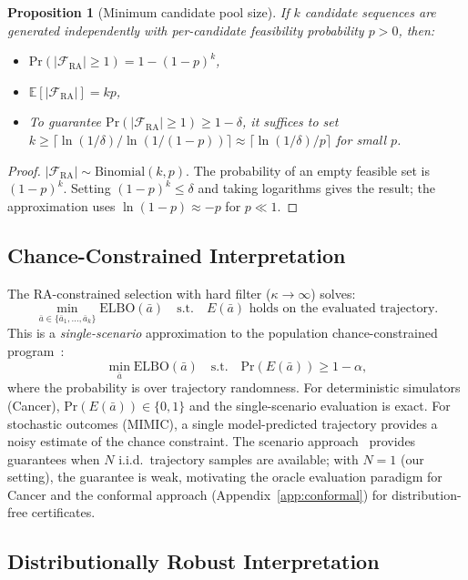 \documentclass{article}
\newtheorem{proposition}[theorem]{Proposition}
\newcommand{\E}{\mathbb{E}}
\renewcommand{\Pr}{\mathrm{Pr}}
\newcommand{\ba}{\bar{a}}
\newcommand{\cF}{\mathcal{F}}
\begin{document}
\begin{proposition}[Minimum candidate pool size]
\label{prop:feasibility}
If $k$ candidate sequences are generated independently with per-candidate feasibility probability $p > 0$, then:
\begin{itemize}
    \item $\Pr(|\cF_{\mathrm{RA}}| \geq 1) = 1 - (1-p)^k$,
    \item $\E[|\cF_{\mathrm{RA}}|] = kp$,
    \item To guarantee $\Pr(|\cF_{\mathrm{RA}}| \geq 1) \geq 1 - \delta$, it suffices to set $k \geq \lceil \ln(1/\delta) / \ln(1/(1-p)) \rceil \approx \lceil \ln(1/\delta) / p \rceil$ for small $p$.
\end{itemize}
\end{proposition}

\begin{proof}
$|\cF_{\mathrm{RA}}| \sim \mathrm{Binomial}(k, p)$. The probability of an empty feasible set is $(1-p)^k$. Setting $(1-p)^k \leq \delta$ and taking logarithms gives the result; the approximation uses $\ln(1-p) \approx -p$ for $p \ll 1$.
\end{proof}

\subsection{Chance-Constrained Interpretation}

The RA-constrained selection with hard filter ($\kappa \to \infty$) solves:
\[
\min_{\ba \in \{\ba_1, \ldots, \ba_k\}} \mathrm{ELBO}(\ba) \quad \text{s.t.} \quad E(\ba) \text{ holds on the evaluated trajectory.}
\]
This is a \emph{single-scenario} approximation to the population chance-constrained program~\citep{nemirovski2006convex}:
\[
\min_{\ba} \mathrm{ELBO}(\ba) \quad \text{s.t.} \quad \Pr(E(\ba)) \geq 1 - \alpha,
\]
where the probability is over trajectory randomness. For deterministic simulators (Cancer), $\Pr(E(\ba)) \in \{0, 1\}$ and the single-scenario evaluation is exact. For stochastic outcomes (MIMIC), a single model-predicted trajectory provides a noisy estimate of the chance constraint. The scenario approach~\citep{calafiore2006scenario} provides guarantees when $N$ i.i.d.\ trajectory samples are available; with $N = 1$ (our setting), the guarantee is weak, motivating the oracle evaluation paradigm for Cancer and the conformal approach (Appendix~\ref{app:conformal}) for distribution-free certificates.

\subsection{Distributionally Robust Interpretation}
\label{sec:dro_interpretation}
\end{document}
